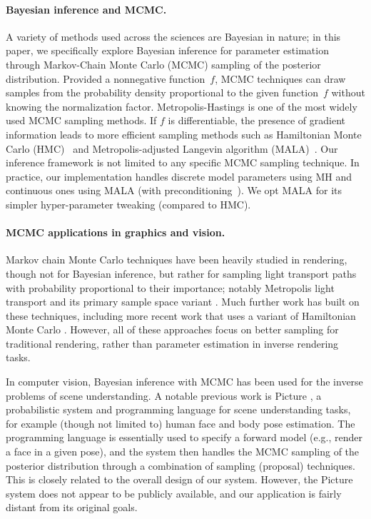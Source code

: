 \paragraph*{Bayesian inference and MCMC.} A variety of methods used across the sciences are Bayesian in nature; in this paper, we specifically explore Bayesian inference for parameter estimation through Markov-Chain Monte Carlo (MCMC) sampling of the posterior distribution. Provided a nonnegative function~$f$, MCMC techniques can draw samples from the probability density proportional to the given function~$f$ without knowing the normalization factor. Metropolis-Hastings \cite{Hastings} is one of the most widely used MCMC sampling methods. If $f$ is differentiable, the presence of gradient information leads to more efficient sampling methods such as Hamiltonian Monte Carlo (HMC)~\cite{Neal2012,Betancourt2017} and Metropolis-adjusted Langevin algorithm (MALA)~\cite{MALA}.
Our inference framework is not limited to any specific MCMC sampling technique.
In practice, our implementation handles discrete model parameters using MH and continuous ones using MALA (with preconditioning~\cite{Santa}). We opt MALA for its simpler hyper-parameter tweaking (compared to HMC).


\paragraph*{MCMC applications in graphics and vision.} Markov chain Monte Carlo techniques have been heavily studied in rendering, though not for Bayesian inference, but rather for sampling light transport paths with probability proportional to their importance; notably Metropolis light transport \cite{MLT} and its primary sample space variant \cite{Kelemen}. Much further work has built on these techniques, including more recent work that uses a variant of Hamiltonian Monte Carlo \cite{H2MC}. However, all of these approaches focus on better sampling for traditional rendering, rather than parameter estimation in inverse rendering tasks.

In computer vision, Bayesian inference with MCMC has been used for the inverse problems of scene understanding. A notable previous work is Picture \cite{Picture}, a probabilistic system and programming language for scene understanding tasks, for example (though not limited to) human face and body pose estimation. The programming language is essentially used to specify a forward model (e.g., render a face in a given pose), and the system then handles the MCMC sampling of the posterior distribution through a combination of sampling (proposal) techniques. This is closely related to the overall design of our system. However, the Picture system does not appear to be publicly available, and our application is fairly distant from its original goals.

